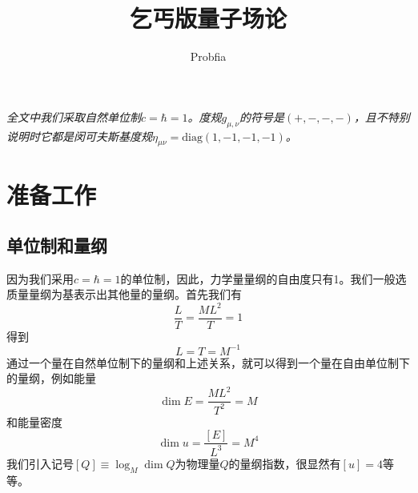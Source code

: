 \documentclass[a4paper,11pt]{ctexart}
\title{乞丐版量子场论}
\author{Probfia}
\date{}
\newcommand{\beq}{\begin{equation}}
\newcommand{\eeq}{\end{equation}}
\newcommand{\diag}{\mathrm{diag}}
\begin{document}
\maketitle
\tableofcontents
\vspace{5mm}
\emph{
全文中我们采取自然单位制$c = \hbar = 1$。度规$g_{\mu,\nu}$的符号是$(+,-,-,-)$，且不特别说明时它都是闵可夫斯基度规$\eta_{\mu \nu} = \diag (1,-1,-1,-1)$。
}
\section{准备工作}
\subsection{单位制和量纲}
因为我们采用$c = \hbar = 1$的单位制，因此，力学量量纲的自由度只有1。我们一般选质量量纲为基表示出其他量的量纲。首先我们有
\beq
\frac{L}{T} = \frac{ML^2}{T} = 1
\eeq
得到
\beq
L = T = M^{-1}
\eeq
通过一个量在自然单位制下的量纲和上述关系，就可以得到一个量在自由单位制下的量纲，例如能量
\beq
\dim E = \frac{ML^2}{T^2} = M
\eeq
和能量密度
\beq
\dim u = \frac{[E]}{L^3} = M^4
\eeq
我们引入记号$[Q] \equiv \log_M \dim Q$为物理量$Q$的量纲指数，很显然有$[u] = 4$等等。
\end{document}
